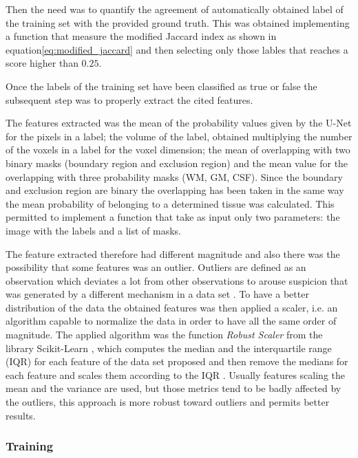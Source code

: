 \documentclass{standalone}
\begin{document}
Then the need was to quantify the agreement of automatically obtained label of the training set with the provided ground truth. This was obtained implementing a function that measure the modified Jaccard index as shown in equation\ref{eq:modified_jaccard} and then selecting only those lables that reaches a score higher than $0.25$.



Once the labels of the training set have been classified as true or false the subsequent step was to properly extract the cited features.

The features extracted was the mean of the probability values given by the U-Net for the pixels in a label; the volume of the label, obtained multiplying the number of the voxels in a label for the voxel dimension; the mean of overlapping with two binary masks (boundary region and exclusion region) and the mean value for the overlapping with three probability masks (WM, GM, CSF).
Since the boundary and exclusion region are binary the overlapping has been taken in the same way the mean probability of belonging to a determined tissue was calculated. This permitted to implement a function that take as input only two parameters: the image with the labels and a list of masks.

The feature extracted therefore had different magnitude and also there was the possibility that some features was an outlier. Outliers are defined as an observation which deviates a lot from other observations to arouse suspicion that was generated by a different mechanism in a data set \cite{ART:outliers}.
To have a better distribution of the data the obtained features was then applied a scaler, i.e. an algorithm capable to normalize the data in order to have all the same order of magnitude.
The applied algorithm was the function \emph{Robust Scaler} from the library Scikit-Learn \cite{scikit-learn}, which computes the median and the interquartile range (IQR) for each feature of the data set proposed and then remove the medians for each feature and scales them according to the IQR \cite{RobustScaler}.
Usually features scaling the mean and the variance are used, but those metrics tend to be badly affected by the outliers, this approach is more robust toward outliers and permits better results.



\subsubsection{Training}
\end{document}
